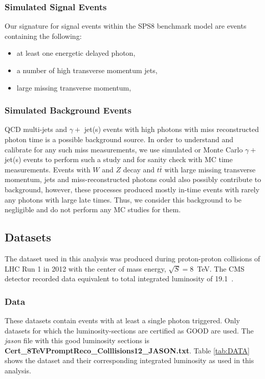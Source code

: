 \subsubsection*{Simulated Signal Events}
Our signature for signal events within the SPS8 benchmark model are events containing the following:

\begin{itemize}
\item at least one energetic delayed photon,
\item a number of high transverse momentum jets,
\item large missing transverse momentum,
\end{itemize}
\subsubsection*{Simulated Background Events}
QCD multi-jets and $\gamma +$ jet(s) events with high \pt photons with miss reconstructed photon time is a possible background source. In order to understand and calibrate  for any such miss measurements, we use simulated or Monte Carlo $\gamma +$ jet(s) events to perform such a study and for sanity check with MC time measurements. Events with $W$ and $Z$ decay  and $t\bar{t}$ with large missing transverse momentum, jets and miss-reconstructed photons could also possibly contribute to background, however, these processes produced mostly in-time events with rarely any photons with large late times. Thus, we consider this background to be negligible and do not perform any MC studies for them. 
\subsection{Datasets}
The dataset used in this analysis was produced during proton-proton collisions of LHC Run 1 in 2012 with the center of mass energy, $\sqrt{S} = 8$~TeV. The CMS detector recorded data equivalent to total integrated luminosity of 19.1~\fbinv .
\subsubsection*{Data}
These datasets contain events with at least a single photon triggered. Only datasets for which the luminosity-sections are certified as GOOD are used. The \textit{jason} file with this good luminosity sections is \textbf{Cert\_8TeVPromptReco\_Colllisions12\_JASON.txt}. Table \ref{tab:DATA} shows the dataset and their corresponding integrated luminosity as used in this analysis.

